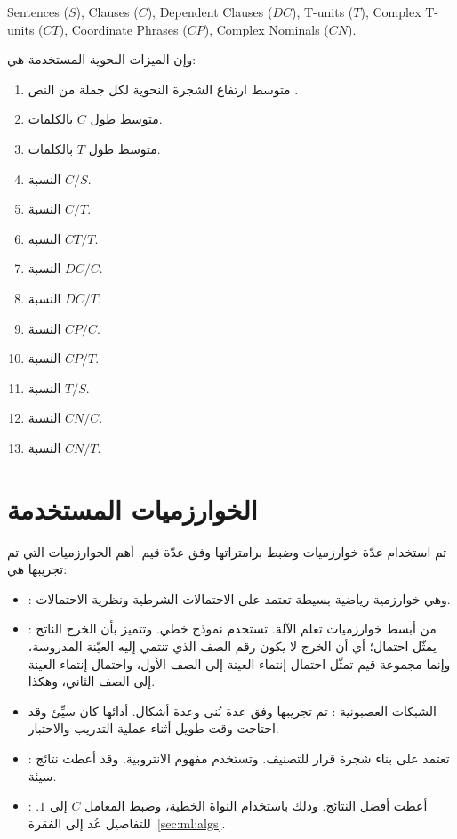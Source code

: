 \begin{english}
	Sentences ($S$), Clauses ($C$), Dependent Clauses ($DC$),
	T-units ($T$), Complex T-units ($CT$), Coordinate Phrases ($CP$),
	Complex Nominals ($CN$).
\end{english}

وإن الميزات النحوية المستخدمة هي:
\begin{enumerate}[resume]
	\item
	متوسط ارتفاع الشجرة النحوية لكل جملة من النص .
	\item 
	متوسط طول $C$ بالكلمات.
	\item 
	متوسط طول $T$ بالكلمات.
	\item 
	النسبة $C/S$.
	\item 
	النسبة $C/T$.
	\item 
	النسبة $CT/T$.
	\item 
	النسبة $DC/C$.
	\item 
	النسبة $DC/T$.
	\item 
	النسبة $CP/C$.
	\item 
	النسبة $CP/T$.
	\item 
	النسبة $T/S$.
	\item 
	النسبة $CN/C$.
	\item 
	النسبة $CN/T$.
\end{enumerate}



\section{الخوارزميات المستخدمة}
تم استخدام عدّة خوارزميات وضبط برامتراتها وفق عدّة قيم.
أهم الخوارزميات التي تم تجريبها هي:
\begin{itemize}
	\item 
	 :
	 وهي خوارزمية رياضية بسيطة تعتمد على الاحتمالات الشرطية ونظرية الاحتمالات.
	 
	 \item 
	 :
	 من أبسط خوارزميات تعلم الآلة.
	 تستخدم نموذج خطي.
	 وتتميز بأن الخرج الناتج يمثّل احتمال؛
	 أي أن الخرج لا يكون رقم الصف الذي تنتمي إليه العيّنة المدروسة،
	 وإنما مجموعة قيم تمثّل احتمال إنتماء العينة إلى الصف الأول، واحتمال إنتماء العينة إلى الصف الثاني، وهكذا.
	 
	 \item 
	 الشبكات العصبونية :
	 تم تجريبها وفق عدة بُنى وعدة أشكال.
	 أدائها كان سيِّئ وقد احتاجت وقت طويل أثناء عملية التدريب والاحتبار.
	 \item 
	 
	 :
	تعتمد على بناء شجرة قرار للتصنيف. وتستخدم مفهوم الانتروبية. وقد أعطت نتائج سيئة.
	 
	 \item
	 :
	أعطت أفضل النتائج.
	وذلك باستخدام النواة الخطية، وضبط المعامل $C$ إلى $1$.
	للتفاصيل عُد إلى الفقرة~\ref{sec:ml:algs}.
\end{itemize}



